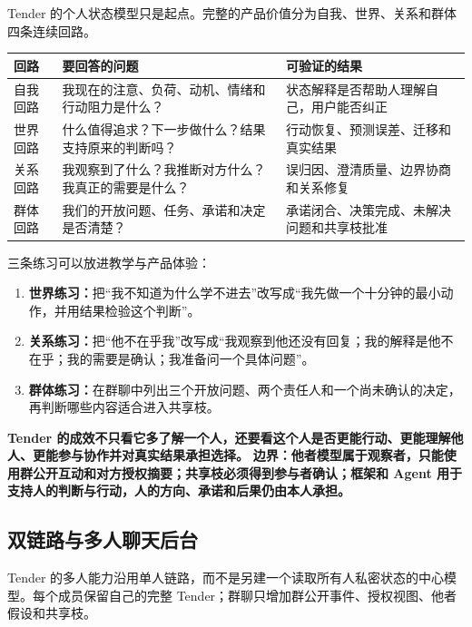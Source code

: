 \documentclass[UTF8,a4paper,11pt]{ctexart}
\newcommand{\hl}[1]{\textcolor{blue!70!black}{\textbf{#1}}}
\newcommand{\warn}[1]{\textcolor{red!70!black}{\textbf{#1}}}
\begin{document}
Tender 的个人状态模型只是起点。完整的产品价值分为自我、世界、关系和群体四条连续回路。

\begin{center}
\begin{longtable}{@{}p{2.8cm}p{4.2cm}p{5.7cm}@{}}
\toprule
\textbf{回路} & \textbf{要回答的问题} & \textbf{可验证的结果} \\
\midrule
自我回路 & 我现在的注意、负荷、动机、情绪和行动阻力是什么？ & 状态解释是否帮助人理解自己，用户能否纠正 \\
世界回路 & 什么值得追求？下一步做什么？结果支持原来的判断吗？ & 行动恢复、预测误差、迁移和真实结果 \\
关系回路 & 我观察到了什么？我推断对方什么？我真正的需要是什么？ & 误归因、澄清质量、边界协商和关系修复 \\
群体回路 & 我们的开放问题、任务、承诺和决定是否清楚？ & 承诺闭合、决策完成、未解决问题和共享枝批准 \\
\bottomrule
\end{longtable}
\end{center}

三条练习可以放进教学与产品体验：

\begin{enumerate}
\item \textbf{世界练习：}把“我不知道为什么学不进去”改写成“我先做一个十分钟的最小动作，并用结果检验这个判断”。
\item \textbf{关系练习：}把“他不在乎我”改写成“我观察到他还没有回复；我的解释是他不在乎；我的需要是确认；我准备问一个具体问题”。
\item \textbf{群体练习：}在群聊中列出三个开放问题、两个责任人和一个尚未确认的决定，再判断哪些内容适合进入共享枝。
\end{enumerate}

\hl{Tender 的成效不只看它多了解一个人，还要看这个人是否更能行动、更能理解他人、更能参与协作并对真实结果承担选择。}
\warn{边界：他者模型属于观察者，只能使用群公开互动和对方授权摘要；共享枝必须得到参与者确认；框架和 Agent 用于支持人的判断与行动，人的方向、承诺和后果仍由本人承担。}

\subsection{双链路与多人聊天后台}

Tender 的多人能力沿用单人链路，而不是另建一个读取所有人私密状态的中心模型。每个成员保留自己的完整 Tender；群聊只增加群公开事件、授权视图、他者假设和共享枝。
\end{document}

